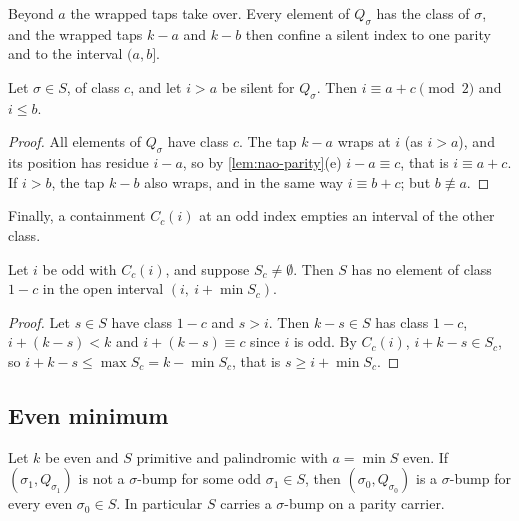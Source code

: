 Beyond $a$ the wrapped taps take over. Every element of $Q_\sigma$ has the
class of $\sigma$, and the wrapped taps $k-a$ and $k-b$ then confine a silent
index to one parity and to the interval $(a,b]$.

\begin{lemma}
\label{lem:nao-dichotomy}
Let $\sigma\in S$, of class $c$, and let $i>a$ be silent for $Q_\sigma$.
Then $i\equiv a+c\pmod2$ and $i\le b$.
\end{lemma}

\begin{proof}
All elements of $Q_\sigma$ have class $c$. The tap $k-a$ wraps at $i$
(as $i>a$), and its position has residue $i-a$, so by
\autoref{lem:nao-parity}(e) $i-a\equiv c$, that is $i\equiv a+c$. If $i>b$,
the tap $k-b$ also wraps, and in the same way $i\equiv b+c$; but
$b\not\equiv a$.
\end{proof}

Finally, a containment $C_c(i)$ at an odd index empties an interval of the
other class.

\begin{lemma}
\label{lem:nao-gap}
Let $i$ be odd with $C_c(i)$, and suppose $S_c\ne\emptyset$. Then $S$ has no
element of class $1-c$ in the open interval $(i,\ i+\min S_c)$.
\end{lemma}

\begin{proof}
Let $s\in S$ have class $1-c$ and $s>i$. Then $k-s\in S$ has class $1-c$,
$i+(k-s)<k$ and $i+(k-s)\equiv c$ since $i$ is odd. By $C_c(i)$,
$i+k-s\in S_c$, so $i+k-s\le\max S_c=k-\min S_c$, that is $s\ge i+\min S_c$.
\end{proof}

\subsection{Even minimum}

\begin{theorem}
\label{thm:nao-evenmin}
Let $k$ be even and $S$ primitive and palindromic with $a=\min S$ even. If
$(\sigma_1,Q_{\sigma_1})$ is not a $\sigma$-bump for some odd
$\sigma_1\in S$, then $(\sigma_0,Q_{\sigma_0})$ is a $\sigma$-bump for every
even $\sigma_0\in S$. In particular $S$ carries a $\sigma$-bump on a parity
carrier.
\end{theorem}

